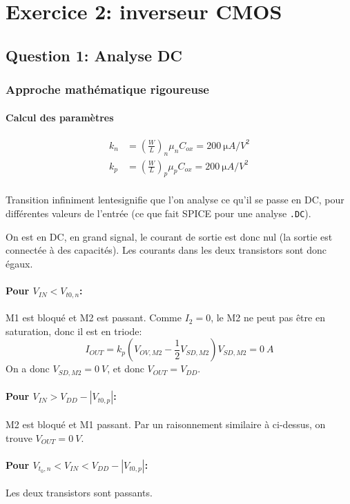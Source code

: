 \documentclass[frenchb,DIV=14]{scrartcl}
\begin{document}
\newpage
\section*{Exercice 2: inverseur CMOS}

\subsection*{Question 1: Analyse DC}
\subsubsection*{Approche mathématique rigoureuse}
\paragraph{Calcul des paramètres}
\begin{align*}
    k_n &= \left(\frac{W}{L}\right)_n \mu_n C_{ox} = \SI{200}{\micro A/V^2} \\
    k_p &= \left(\frac{W}{L}\right)_p \mu_p C_{ox} = \SI{200}{\micro A/V^2} \\
\end{align*}

\og Transition infiniment lente\fg signifie que l'on analyse ce qu'il se passe
en DC, pour différentes valeurs de l'entrée (ce que fait SPICE pour une analyse
\texttt{.DC}).

On est en DC, en grand signal, le courant de sortie est donc nul (la sortie est
connectée à des capacités). Les courants dans les deux transistors sont donc
égaux.

\paragraph{Pour $V_{IN} < V_{t0,n}$:}
M1 est bloqué et M2 est passant.
Comme $I_{2} = 0$, le M2 ne peut pas être en saturation,
donc il est en triode:
\[I_{OUT} = k_p \left(V_{OV,M2} - \frac{1}{2} V_{SD,M2}\right)V_{SD,M2} = \SI{0}{A}\]
On a donc $V_{SD,M2} = \SI{0}{V}$, et donc $V_{OUT} = V_{DD}$.

\paragraph{Pour $V_{IN} > V_{DD} - \left|V_{t0,p}\right|$:}
M2 est bloqué et M1 passant. Par un raisonnement similaire à ci-dessus,
on trouve $V_{OUT} = \SI{0}{V}$.

\paragraph{Pour $V_{t_0,n} < V_{IN} < V_{DD} - \left|V_{t0,p}\right|$:}
Les deux transistors sont passants.
\end{document}
